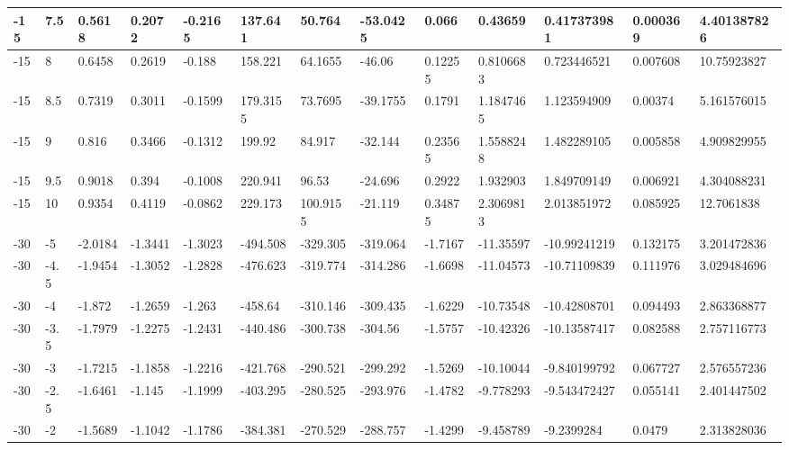 \begin{longtable}{|l|l|l|l|l|l|l|l|l|l|l|l|l|}
-15   & 7.5   & 0.5618  & 0.2072  & -0.2165 & 137.641  & 50.764   & -53.0425 & 0.066    & 0.43659     & 0.417373981    & 0.000369                 & 4.401387826 \\ \hline
-15   & 8     & 0.6458  & 0.2619  & -0.188  & 158.221  & 64.1655  & -46.06   & 0.12255  & 0.8106683   & 0.723446521    & 0.007608                 & 10.75923827 \\ \hline
-15   & 8.5   & 0.7319  & 0.3011  & -0.1599 & 179.3155 & 73.7695  & -39.1755 & 0.1791   & 1.1847465   & 1.123594909    & 0.00374                  & 5.161576015 \\ \hline
-15   & 9     & 0.816   & 0.3466  & -0.1312 & 199.92   & 84.917   & -32.144  & 0.23565  & 1.5588248   & 1.482289105    & 0.005858                 & 4.909829955 \\ \hline
-15   & 9.5   & 0.9018  & 0.394   & -0.1008 & 220.941  & 96.53    & -24.696  & 0.2922   & 1.932903    & 1.849709149    & 0.006921                 & 4.304088231 \\ \hline
-15   & 10    & 0.9354  & 0.4119  & -0.0862 & 229.173  & 100.9155 & -21.119  & 0.34875  & 2.3069813   & 2.013851972    & 0.085925                 & 12.7061838  \\ \hline
-30   & -5    & -2.0184 & -1.3441 & -1.3023 & -494.508 & -329.305 & -319.064 & -1.7167  & -11.35597   & -10.99241219   & 0.132175                 & 3.201472836 \\ \hline
-30   & -4.5  & -1.9454 & -1.3052 & -1.2828 & -476.623 & -319.774 & -314.286 & -1.6698  & -11.04573   & -10.71109839   & 0.111976                 & 3.029484696 \\ \hline
-30   & -4    & -1.872  & -1.2659 & -1.263  & -458.64  & -310.146 & -309.435 & -1.6229  & -10.73548   & -10.42808701   & 0.094493                 & 2.863368877 \\ \hline
-30   & -3.5  & -1.7979 & -1.2275 & -1.2431 & -440.486 & -300.738 & -304.56  & -1.5757  & -10.42326   & -10.13587417   & 0.082588                 & 2.757116773 \\ \hline
-30   & -3    & -1.7215 & -1.1858 & -1.2216 & -421.768 & -290.521 & -299.292 & -1.5269  & -10.10044   & -9.840199792   & 0.067727                 & 2.576557236 \\ \hline
-30   & -2.5  & -1.6461 & -1.145  & -1.1999 & -403.295 & -280.525 & -293.976 & -1.4782  & -9.778293   & -9.543472427   & 0.055141                 & 2.401447502 \\ \hline
-30   & -2    & -1.5689 & -1.1042 & -1.1786 & -384.381 & -270.529 & -288.757 & -1.4299  & -9.458789   & -9.2399284     & 0.0479                   & 2.313828036 \\ \hline

\end{longtable}

